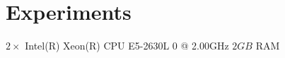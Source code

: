 {
\abnormalparskip{0pt}
\chapter{Experiments}
\label{cha:experiments}
}
\chapterbreak{}

$2 \times$ Intel(R) Xeon(R) CPU E5-2630L 0 @ 2.00GHz
$2 GB$ RAM

